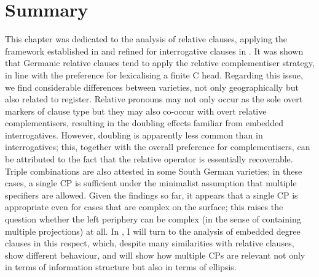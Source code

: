 \section{Summary} \label{sec:4summary}
This chapter was dedicated to the analysis of relative clauses, applying the framework established in  and refined for interrogative clauses in . It was shown that Germanic relative clauses tend to apply the relative complementiser strategy, in line with the preference for lexicalising a finite C head. Regarding this issue, we find considerable differences between varieties, not only geographically but also related to register. Relative pronouns may not only occur as the sole overt markers of clause type but they may also co-occur with overt relative complementisers, resulting in the doubling effects familiar from embedded interrogatives. However, doubling is apparently less common than in interrogatives; this, together with the overall preference for complementisers, can be attributed to the fact that the relative operator is essentially recoverable. Triple combinations are also attested in some South German varieties; in these cases, a single CP is sufficient under the minimalist assumption that multiple specifiers are allowed. Given the findings so far, it appears that a single CP is appropriate even for cases that are complex on the surface; this raises the question whether the left periphery can be complex (in the sense of containing multiple projections) at all. In , I will turn to the analysis of embedded degree clauses in this respect, which, despite many similarities with relative clauses, show different behaviour, and  will show how multiple CPs are relevant not only in terms of information structure but also in terms of ellipsis.
